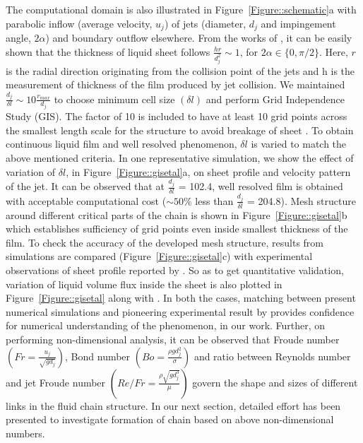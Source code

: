 \documentclass{jfm}
\begin{document}
The computational domain is also illustrated in Figure~\ref{Figure::schematic}a with parabolic inflow (average velocity, $u_j$) of jets (diameter, $d_j$ and impingement angle, $2\alpha$) and boundary outflow elsewhere. From the works of \cite{choo2001parametric}, it can be easily shown that the thickness of liquid sheet follows $\frac{hr}{d_j^2} \sim 1$, for $2\alpha \in \{0,\pi/2\}$.  Here, $r$ is the radial direction originating from the collision point of the jets and h is the measurement of thickness of the film produced by jet collision. We maintained $\frac{d_j}{\delta l} \sim 10\frac{r_{max}}{d_j}$ to choose minimum cell size $\left(\delta l\right)$ and perform Grid Independence Study (GIS). The factor of 10 is included to have at least 10 grid points\citep{ling2015multiscale} across the smallest length scale for the structure to avoid breakage of sheet \citep{chen2013high}. To obtain continuous liquid film and well resolved phenomenon, $\delta l$ is varied to match the above mentioned criteria. In one representative simulation, we show the effect of variation of $\delta l$, in Figure~\ref{Figure::gisetal}a, on sheet profile and velocity pattern of the jet. It can be observed that at $\frac{d_j}{\delta l}$ = 102.4, well resolved film is obtained with acceptable computational cost ($\sim 50\%$ less than $\frac{d_j}{\delta l}$ = 204.8). Mesh structure around different critical parts of the chain is shown in Figure~\ref{Figure::gisetal}b which establishes sufficiency of grid points even inside smallest thickness of the film. To check the accuracy of the developed mesh structure, results from simulations are compared (Figure~\ref{Figure::gisetal}c) with experimental observations of sheet profile reported by \cite{bush2004collision}. So as to get quantitative validation, variation of liquid volume flux inside the sheet is also plotted in Figure~\ref{Figure::gisetal} along with \cite{bush2004collision}. In both the cases, matching between present numerical simulations and pioneering experimental result by \cite{bush2004collision} provides confidence for numerical understanding of the phenomenon, in our work. Further, on performing non-dimensional analysis, it can be observed that Froude number $\left(Fr = \frac{u_j}{\sqrt{gd_j}}\right)$, Bond number $\left(Bo = \frac{\rho gd_j^2}{\sigma}\right)$ and ratio between Reynolds number and jet Froude number $\left(Re/Fr = \frac{\rho\sqrt{gd_j^3}}{\mu}\right)$ govern the shape and sizes of different links in the fluid chain structure. In our next section, detailed effort has been presented to investigate formation of chain based on above non-dimensional numbers.
\end{document}
